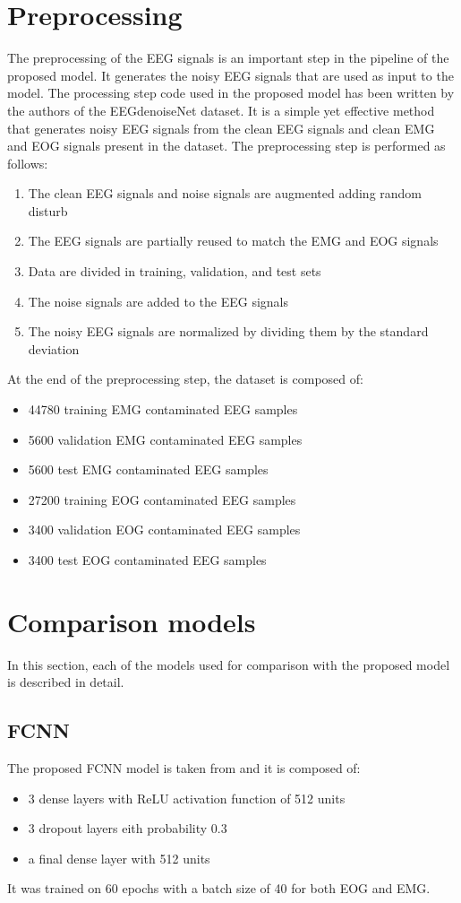 \documentclass[a4paper, noexaminfo]{sapthesis}
\begin{document}
\section{Preprocessing}
The preprocessing of the EEG signals is an important step in the
pipeline of the proposed model. It generates the noisy EEG
signals that are used as input to the model.
The processing step code used in the proposed model has been
written by the authors of the EEGdenoiseNet
dataset\cite{EEGdenoiseNet}. It is a simple yet effective method that
generates noisy EEG signals from the clean EEG signals and clean 
EMG and EOG signals present in the dataset.
The preprocessing step is performed as follows:
\begin{enumerate}
\item The clean EEG signals and noise signals are augmented adding 
random disturb
\item The EEG signals are partially reused to match the EMG and EOG
signals
\item Data are divided in training, validation, and test sets
\item The noise signals are added to the EEG signals
\item The noisy EEG signals are normalized by dividing them by the
standard deviation
\end{enumerate}
At the end of the preprocessing step, the dataset is composed of:
\begin{itemize}
\item 44780 training EMG contaminated EEG samples
\item 5600 validation EMG contaminated EEG samples
\item 5600 test EMG contaminated EEG samples
\item 27200 training EOG contaminated EEG samples
\item 3400 validation EOG contaminated EEG samples
\item 3400 test EOG contaminated EEG samples
\end{itemize}
\section{Comparison models}
In this section, each of the models used for comparison with the
proposed model is described in detail.
\subsection{FCNN}\label{sec:model_fcnn}
The proposed FCNN model is taken from\cite{EEGdenoiseNet} and it is 
composed of:
\begin{itemize}
\item 3 dense layers with ReLU activation function of 512 units
\item 3 dropout layers eith probability 0.3
\item a final dense layer with 512 units
\end{itemize}
It was trained on 60 epochs with a batch size of 40 for both EOG and EMG.
\end{document}
